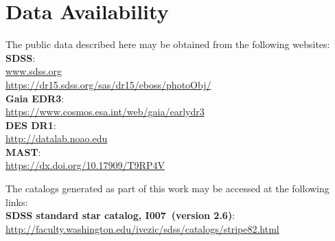 \documentclass[fleqn,usenatbib]{mnras}
\newcommand{\pO}{\hbox{I007}}
\begin{document}





\section*{Data Availability \label{sec:DataAv}}

\noindent The public data described here may be obtained from the following websites: \\
{\bf SDSS}:\\
\url{www.sdss.org}\\ 
\url{https://dr15.sdss.org/sas/dr15/eboss/photoObj/}\\
{\bf Gaia EDR3}:\\
\url{https://www.cosmos.esa.int/web/gaia/earlydr3}\\
{\bf DES DR1}:\\
\url{http://datalab.noao.edu}\\
{\bf MAST}:\\
\url{https://dx.doi.org/10.17909/T9RP4V}

\noindent The catalogs generated as part of this work may be accessed at the following links:\\
{\bf SDSS standard star catalog, \pO\ (version 2.6)}:
\url{http://faculty.washington.edu/ivezic/sdss/catalogs/stripe82.html}

\end{document}
